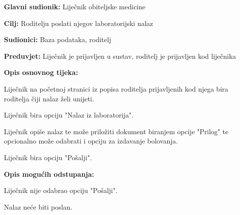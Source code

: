 					\noindent {}
					\begin{packed_item}
						
						\item \textbf{Glavni sudionik: }Liječnik obiteljske medicine
						\item  \textbf{Cilj:} Roditelju poslati njegov laboratorijski nalaz 
						\item  \textbf{Sudionici:} Baza podataka, roditelj
						\item  \textbf{Preduvjet:} Liječnik je prijavljen u sustav, roditelj je prijavljen kod liječnika
						\item  \textbf{Opis osnovnog tijeka:}
						
						\item[] \begin{packed_enum}
							
							\item Liječnik na početnoj stranici iz popisa roditelja prijavljenih kod njega bira roditelja čiji nalaz želi unijeti.
							\item Liječnik bira opciju "Nalaz iz laboratorija".
							\item Liječnik opiše nalaz te može priložiti dokument biranjem opcije "Prilog" te opcionalno može odabrati i opciju za izdavanje bolovanja.
							\item Liječnik bira opciju "Pošalji".
						\end{packed_enum}
						
						\item  \textbf{Opis mogućih odstupanja:}
						
						\item[] \begin{packed_item}
							
							\item[4.a] Liječnik nije odabrao opciju "Pošalji".
							\item[] \begin{packed_enum}
								
								\item Nalaz neće biti poslan.
							\end{packed_enum}
							
							
						\end{packed_item}
						
						
					\end{packed_item}
					
